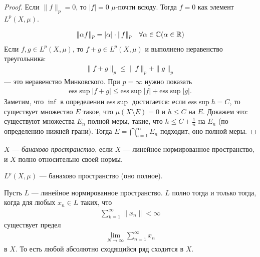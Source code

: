 \begin{proof}
 Если $\|f\|_p = 0$, то  $\left| f \right| = 0$ $\mu$-почти всюду. Тогда $f = 0$ как элемент $L^{p}(X, \mu)$.

 \begin{align*}
  \| \alpha f \|_p = \left| \alpha \right| \cdot \| f \|_p \quad \forall \alpha \in \mathbb{C} (\alpha \in \mathbb{R})
 \end{align*} Если $f,g \in L^{p}(X,\mu)$, то $f + g \in L^{p}(X, \mu)$ и выполнено неравенство треугольника: \begin{align*}
  \| f + g \|_p \leqslant \|f \|_p + \|g\|_p
 \end{align*}  --- это неравенство Минковского. При $p=\infty$ нужно показать \begin{align*}
 \mathrm{ess} \sup \left| f+g \right| \leqslant \mathrm{ess} \sup \left| f \right| + \mathrm{ess} \sup \left| g \right|
.\end{align*} Заметим, что $\inf$ в определении  $\mathrm{ess} \sup$ достигается: если $\mathrm{ess} \sup h = C$, то существует множество $E$ такое, что $\mu(X \setminus E) = 0$ и $h \leqslant C$ на $E$. Докажем это: существуют множества $E_n$ полной меры, такие, что $h \leqslant C + \frac{1}{n}$ на $E_n$ (по определению нижней грани). Тогда  $E = \bigcap_{n=1}^{\infty} E_n $ подходит,  оно полной меры.
\end{proof}
\begin{df}
 $X$ --- \textit{банахово пространство}, если $X$ --- линейное нормированное пространство, и $X$ полно относительно своей нормы.
\end{df}
\begin{thm}
 \label{theorem:lebesgue_space_is_banach}
 $L^{p}(X, \mu)$ --- банахово пространство (оно полное).
\end{thm}
\begin{lm}
 Пусть $L$ --- линейное нормированное пространство. $L$ полно тогда и только тогда, когда для любых $x_n \in L$ таких, что \begin{align*}
  \sum_{k=1}^{\infty} \|x_n\| < \infty
 \end{align*}  существует предел \begin{align*}
  \lim_{N \to \infty} \sum_{n=1}^{\infty} x_n
 \end{align*} в $X$. То есть любой абсолютно сходящийся ряд сходится в $X$.
\end{lm}
